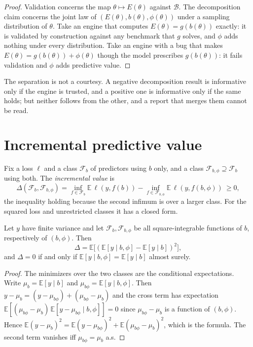 \begin{proof}
Validation concerns the map $\theta\mapsto E(\theta)$ against $\mathcal B$. The decomposition claim concerns the joint law of $(E(\theta),b(\theta),\phi(\theta))$ under a sampling distribution of $\theta$. Take an engine that computes $E(\theta)=g(b(\theta))$ exactly: it is validated by construction against any benchmark that $g$ solves, and $\phi$ adds nothing under every distribution. Take an engine with a bug that makes $E(\theta)=g(b(\theta))+\phi(\theta)$ though the model prescribes $g(b(\theta))$: it fails validation and $\phi$ adds predictive value.
\end{proof}

The separation is not a courtesy. A negative decomposition result is informative only if the engine is trusted, and a positive one is informative only if the same holds; but neither follows from the other, and a report that merges them cannot be read.

\section{Incremental predictive value}

Fix a loss $\ell$ and a class $\mathcal F_b$ of predictors using $b$ only, and a class $\mathcal F_{b,\phi}\supseteq\mathcal F_b$ using both. The \emph{incremental value} is
\[
\Delta(\mathcal F_b,\mathcal F_{b,\phi})=\inf_{f\in\mathcal F_b}\mathbb E\,\ell(y,f(b))-\inf_{f\in\mathcal F_{b,\phi}}\mathbb E\,\ell(y,f(b,\phi))\ \ge0,
\]
the inequality holding because the second infimum is over a larger class. For the squared loss and unrestricted classes it has a closed form.

\begin{theorem}
\label{thm:incremental}
Let $y$ have finite variance and let $\mathcal F_b,\mathcal F_{b,\phi}$ be all square-integrable functions of $b$, respectively of $(b,\phi)$. Then
\[
\Delta=\mathbb E\big[(\mathbb E[y\mid b,\phi]-\mathbb E[y\mid b])^2\big],
\]
and $\Delta=0$ if and only if $\mathbb E[y\mid b,\phi]=\mathbb E[y\mid b]$ almost surely.
\end{theorem}

\begin{proof}
The minimizers over the two classes are the conditional expectations. Write $\mu_b=\mathbb E[y\mid b]$ and $\mu_{b\phi}=\mathbb E[y\mid b,\phi]$. Then $y-\mu_b=(y-\mu_{b\phi})+(\mu_{b\phi}-\mu_b)$ and the cross term has expectation $\mathbb E[(\mu_{b\phi}-\mu_b)\,\mathbb E[y-\mu_{b\phi}\mid b,\phi]]=0$ since $\mu_{b\phi}-\mu_b$ is a function of $(b,\phi)$. Hence $\mathbb E(y-\mu_b)^2=\mathbb E(y-\mu_{b\phi})^2+\mathbb E(\mu_{b\phi}-\mu_b)^2$, which is the formula. The second term vanishes iff $\mu_{b\phi}=\mu_b$ a.s.
\end{proof}

